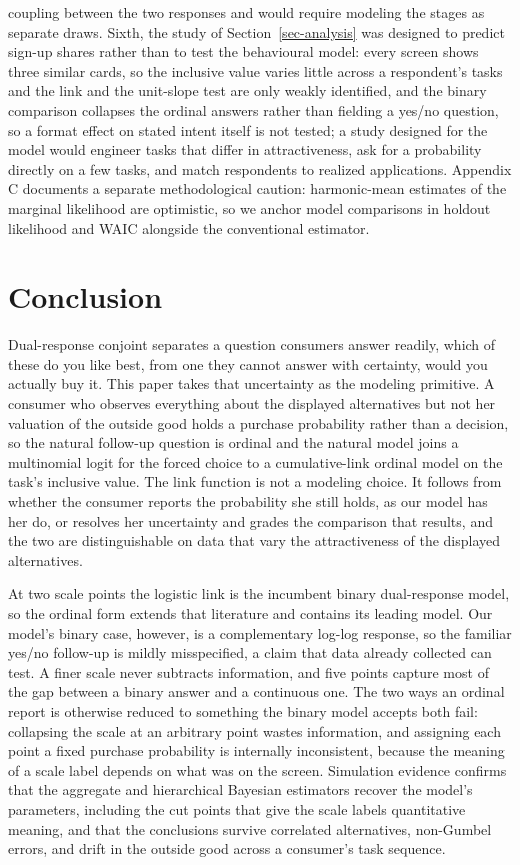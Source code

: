 \documentclass[
  letterpaper,
  DIV=11,
  numbers=noendperiod]{scrartcl}
\theoremstyle{plain}
\theoremstyle{plain}
\theoremstyle{plain}
\theoremstyle{remark}
\begin{document}
coupling between the two responses and would require modeling the stages
as separate draws. Sixth, the study of Section~\ref{sec-analysis} was
designed to predict sign-up shares rather than to test the behavioural
model: every screen shows three similar cards, so the inclusive value
varies little across a respondent's tasks and the link and the
unit-slope test are only weakly identified, and the binary comparison
collapses the ordinal answers rather than fielding a yes/no question, so
a format effect on stated intent itself is not tested; a study designed
for the model would engineer tasks that differ in attractiveness, ask
for a probability directly on a few tasks, and match respondents to
realized applications. Appendix C documents a separate methodological
caution: harmonic-mean estimates of the marginal likelihood are
optimistic, so we anchor model comparisons in holdout likelihood and
WAIC alongside the conventional estimator.

\section{Conclusion}\label{sec-conclusion}

Dual-response conjoint separates a question consumers answer readily,
which of these do you like best, from one they cannot answer with
certainty, would you actually buy it. This paper takes that uncertainty
as the modeling primitive. A consumer who observes everything about the
displayed alternatives but not her valuation of the outside good holds a
purchase probability rather than a decision, so the natural follow-up
question is ordinal and the natural model joins a multinomial logit for
the forced choice to a cumulative-link ordinal model on the task's
inclusive value. The link function is not a modeling choice. It follows
from whether the consumer reports the probability she still holds, as
our model has her do, or resolves her uncertainty and grades the
comparison that results, and the two are distinguishable on data that
vary the attractiveness of the displayed alternatives.

At two scale points the logistic link is the incumbent binary
dual-response model, so the ordinal form extends that literature and
contains its leading model. Our model's binary case, however, is a
complementary log-log response, so the familiar yes/no follow-up is
mildly misspecified, a claim that data already collected can test. A
finer scale never subtracts information, and five points capture most of
the gap between a binary answer and a continuous one. The two ways an
ordinal report is otherwise reduced to something the binary model
accepts both fail: collapsing the scale at an arbitrary point wastes
information, and assigning each point a fixed purchase probability is
internally inconsistent, because the meaning of a scale label depends on
what was on the screen. Simulation evidence confirms that the aggregate
and hierarchical Bayesian estimators recover the model's parameters,
including the cut points that give the scale labels quantitative
meaning, and that the conclusions survive correlated alternatives,
non-Gumbel errors, and drift in the outside good across a consumer's
task sequence.
\end{document}
